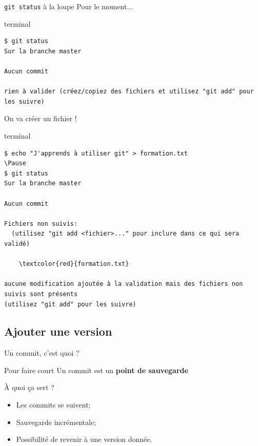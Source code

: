 \documentclass[usepdftitle=false]{beamer}
\def\seplength{.3\topsep}
\newcommand{\Pause}{%
\ifdef{\Release}
  {\pause}
  {}
}
\begin{document}
\begin{frame}[fragile]{\texttt{git status} à la loupe}
	Pour le moment...

	\begin{beamercolorbox}[rounded=true,shadow=true]{terminal}
\vspace{-\seplength}
\begin{Verbatim}
$ git status
Sur la branche master

Aucun commit

rien à valider (créez/copiez des fichiers et utilisez "git add" pour les suivre)
\end{Verbatim}
	\end{beamercolorbox}

	\Pause

	On va créer un fichier !

	\begin{beamercolorbox}[rounded=true,shadow=true]{terminal}
\vspace{-\seplength}
\begin{Verbatim}
$ echo "J'apprends à utiliser git" > formation.txt
\Pause
$ git status
Sur la branche master

Aucun commit

Fichiers non suivis:
  (utilisez "git add <fichier>..." pour inclure dans ce qui sera validé)

	\textcolor{red}{formation.txt}

aucune modification ajoutée à la validation mais des fichiers non suivis sont présents
(utilisez "git add" pour les suivre)

\end{Verbatim}
\end{beamercolorbox}

\end{frame}

\subsection{Ajouter une version}

\begin{frame}{Un commit, c'est quoi ?}

	\begin{block}{Pour faire court}
		Un commit est un \textbf{point de sauvegarde}
	\end{block}

\bigskip

\`A quoi ça sert ?
\begin{itemize}
\item Les commits se suivent;
\item Sauvegarde incrémentale;
\item Possibilité de revenir à une version donnée.
\end{itemize}
\end{frame}
\end{document}
